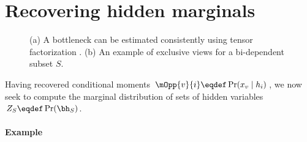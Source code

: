 \section{Recovering hidden marginals}
\label{sec:hiddenMarginals}

\begin{figure}
  \centering

  \caption{
    \label{fig:bottleneckExclusiveViews}
  (a) A bottleneck can be estimated consistently
  using tensor factorization \citep{anandkumar13tensor}.
  (b) An example of exclusive views for a bi-dependent subset $S$.
  }
\end{figure}


Having recovered conditional moments $\mOpp{v}{i} \eqdef \Pr(x_v \mid h_i)$,
we now seek to compute the marginal distribution of sets of hidden variables
$Z_S \eqdef \Pr(\bh_S)$.


\paragraph{Example}

